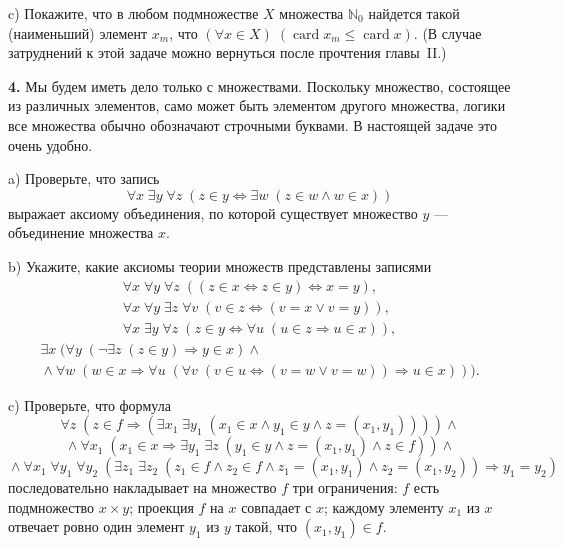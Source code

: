 \medskip

c) Покажите, что в любом подмножестве $X$ множества $\mathbb{N}_0$ найдется такой
(наименьший) элемент $x_m$, что $(\forall x \in X)\; (\operatorname{card} x_m \leqslant \operatorname{card} x)$. (В случае
затруднений к этой задаче можно вернуться после прочтения главы~II.)

\textbf{4.}\; Мы будем иметь дело только с множествами. Поскольку множество,
состоящее из различных элементов, само может быть элементом другого множества,
логики все множества обычно обозначают строчными буквами. В настоящей задаче
это очень удобно.

a) Проверьте, что запись
\[
  \forall x\; \exists y\; \forall z\; (z \in y \Leftrightarrow \exists w\; (z \in w \land w \in x))
\]
выражает аксиому объединения, по которой существует множество $y$ --- объединение
множества $x$.

b) Укажите, какие аксиомы теории множеств представлены записями
\begin{gather*}
  \forall x\; \forall y\; \forall z\; ((z \in x \Leftrightarrow z \in y) \Leftrightarrow x = y), \\
  \forall x\; \forall y\; \exists z\; \forall v\; (v \in z \Leftrightarrow (v = x \lor v = y)), \\
  \forall x\; \exists y\; \forall z\; (z \in y \Leftrightarrow \forall u\; (u \in z \Rightarrow u \in x)),
\end{gather*}
\begin{multline*}
  \exists x\; (\forall y\; (\neg \exists z\; (z \in y) \Rightarrow y \in x) \land {} \\
  {} \land \forall w\; (w \in x \Rightarrow \forall u\; (\forall v\; (v \in u \Leftrightarrow (v = w \lor v = w)) \Rightarrow u \in x))).
\end{multline*}

c) Проверьте, что формула
\[
  \forall z\; (z \in f \Rightarrow (\exists x_1\; \exists y_1\; (x_1 \in x \land y_1 \in y \land z = (x_1, y_1)))) \land {}
\]
\[
  {} \land \forall x_1\; (x_1 \in x \Rightarrow \exists y_1\; \exists z\; (y_1 \in y \land z = (x_1, y_1) \land z \in f)) \land {}
\]
\[
  {} \land \forall x_1\; \forall y_1\; \forall y_2\;
  (\exists z_1\; \exists z_2\; (z_1 \in f \land z_2 \in f \land z_1 = (x_1, y_1) \land z_2 = (x_1, y_2))
  \Rightarrow y_1 = y_2)
\]
последовательно накладывает на множество $f$ три ограничения: $f$ есть подмножество $x \times y$; проекция $f$ на $x$ совпадает с $x$; каждому элементу $x_1$ из $x$ отвечает ровно
один элемент $y_1$ из $y$ такой, что $(x_1, y_1) \in f$.

